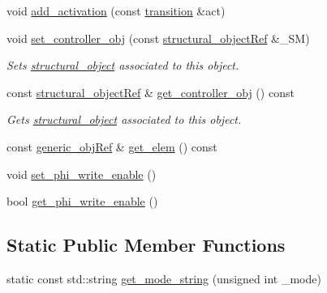 \begin{DoxyCompactItemize}
void \hyperlink{classcommandport__obj_aa0cb7794affc8302cb3c19e3bf47c70c}{add\+\_\+activation} (const \hyperlink{classcommandport__obj_aae52b929cff6d84d461b91d88baa3203}{transition} \&act)
\item 
void \hyperlink{classcommandport__obj_a3f2c860a8418fe49dc6e866d5f14e7d7}{set\+\_\+controller\+\_\+obj} (const \hyperlink{structural__objects_8hpp_a8ea5f8cc50ab8f4c31e2751074ff60b2}{structural\+\_\+object\+Ref} \&\+\_\+\+SM)
\begin{DoxyCompactList}\small\item\em Sets \hyperlink{classstructural__object}{structural\+\_\+object} associated to this object. \end{DoxyCompactList}\item 
const \hyperlink{structural__objects_8hpp_a8ea5f8cc50ab8f4c31e2751074ff60b2}{structural\+\_\+object\+Ref} \& \hyperlink{classcommandport__obj_a746c7362dd398aa7f7136f9a93153837}{get\+\_\+controller\+\_\+obj} () const
\begin{DoxyCompactList}\small\item\em Gets \hyperlink{classstructural__object}{structural\+\_\+object} associated to this object. \end{DoxyCompactList}\item 
const \hyperlink{generic__obj_8hpp_acb533b2ef8e0fe72e09a04d20904ca81}{generic\+\_\+obj\+Ref} \& \hyperlink{classcommandport__obj_ace1e0dbfe89561ffebf2f68fc7ba5c01}{get\+\_\+elem} () const
\item 
void \hyperlink{classcommandport__obj_ad8ccac87ff5cc3880fdc8bacd1233f8c}{set\+\_\+phi\+\_\+write\+\_\+enable} ()
\item 
bool \hyperlink{classcommandport__obj_a6b439abbd878de897af649fb41ceeb74}{get\+\_\+phi\+\_\+write\+\_\+enable} ()
\end{DoxyCompactItemize}
\subsection*{Static Public Member Functions}
\begin{DoxyCompactItemize}
\item 
static const std\+::string \hyperlink{classcommandport__obj_aa6c5c7124b925fa46de54d8efddc5bf0}{get\+\_\+mode\+\_\+string} (unsigned int \+\_\+mode)
\end{DoxyCompactItemize}
